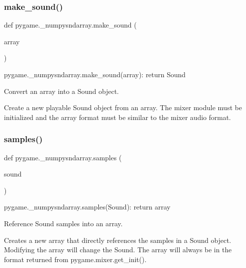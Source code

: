 \subsubsection{\texorpdfstring{make\+\_\+sound()}{make\_sound()}}
{\footnotesize\ttfamily def pygame.\+\_\+numpysndarray.\+make\+\_\+sound (\begin{DoxyParamCaption}\item[{}]{array }\end{DoxyParamCaption})}

\begin{DoxyVerb}pygame._numpysndarray.make_sound(array): return Sound

Convert an array into a Sound object.

Create a new playable Sound object from an array. The mixer module
must be initialized and the array format must be similar to the mixer
audio format.
\end{DoxyVerb}
 \mbox{\label{namespacepygame_1_1__numpysndarray_a9c6c1a49e395ab900de24c97a1cbfa47}} 
\subsubsection{\texorpdfstring{samples()}{samples()}}
{\footnotesize\ttfamily def pygame.\+\_\+numpysndarray.\+samples (\begin{DoxyParamCaption}\item[{}]{sound }\end{DoxyParamCaption})}

\begin{DoxyVerb}pygame._numpysndarray.samples(Sound): return array

Reference Sound samples into an array.

Creates a new array that directly references the samples in a Sound
object. Modifying the array will change the Sound. The array will
always be in the format returned from pygame.mixer.get_init().
\end{DoxyVerb}
 